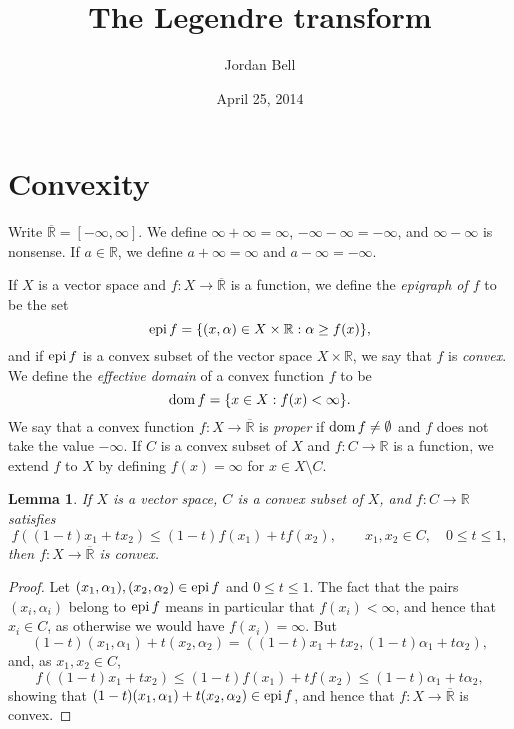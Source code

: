 \documentclass{article}
\newcommand{\epi}{\ensuremath\mathrm{epi}\,}
\newcommand{\dom}{\ensuremath\mathrm{dom}\,}
\newcommand{\extreals}{\overline{\mathbb{R}}}
\newtheorem{lemma}[theorem]{Lemma}
\theoremstyle{definition}
\begin{document}
\title{The Legendre transform}
\author{Jordan Bell}
\date{April 25, 2014}

\maketitle



\section{Convexity}
Write $\extreals=[-\infty,\infty]$. 
We define $\infty+\infty=\infty$, $-\infty-\infty=-\infty$, and $\infty-\infty$ is nonsense. If $a \in \mathbb{R}$, we define $a+\infty=\infty$ and
$a-\infty=-\infty$.

If $X$ is a vector space and $f:X \to \extreals$ is a function, we define the {\em epigraph of $f$} to be the set
\[
\epi f = \{(x,\alpha) \in X \times \mathbb{R}: \alpha \geq f(x)\},
\]
and
if $\epi f$ is a convex subset of the vector space $X \times \mathbb{R}$, we say that $f$ is {\em convex}. We
define the {\em effective domain} of a convex function $f$ to be
\[
\dom f = \{x \in X: f(x)<\infty\}.
\]
We say that a convex function $f:X \to \extreals$ is {\em proper} if $\dom f  \neq \emptyset$ and $f$ does not take the value $-\infty$.
If $C$ is a  convex subset of $X$ and $f:C \to \mathbb{R}$ is a function, we extend 
$f$ to $X$ by defining $f(x)=\infty$ for $x \in X \setminus C$. 

\begin{lemma}
If $X$ is a vector space, $C$ is a convex subset of $X$, and $f:C \to \mathbb{R}$ satisfies
\[
f((1-t)x_1+tx_2) \leq (1-t)f(x_1)+tf(x_2), \qquad x_1,x_2 \in C, \quad 0 \leq t \leq 1,
\]
then $f:X \to \extreals$ is convex.
\end{lemma}
\begin{proof}
Let $(x_1,\alpha_1),(x_2,\alpha_2) \in \epi f$ and $0 \leq t \leq 1$. The fact that the pairs
 $(x_i,\alpha_i)$ belong to $\epi f$ means in particular
that $f(x_i)<\infty$, and hence that $x_i \in C$, as otherwise we would have $f(x_i)=\infty$. 
But
\[
(1-t)(x_1,\alpha_1)+t(x_2,\alpha_2)=((1-t)x_1+tx_2,(1-t)\alpha_1+t\alpha_2),
\]
and, as $x_1,x_2 \in C$,
\[
f((1-t)x_1+tx_2) \leq (1-t)f(x_1)+tf(x_2) \leq (1-t)\alpha_1+t\alpha_2,
\]
showing that $(1-t)(x_1,\alpha_1)+t(x_2,\alpha_2) \in \epi f$, and hence that $f:X \to \extreals$ is convex.
\end{proof}
\end{document}
